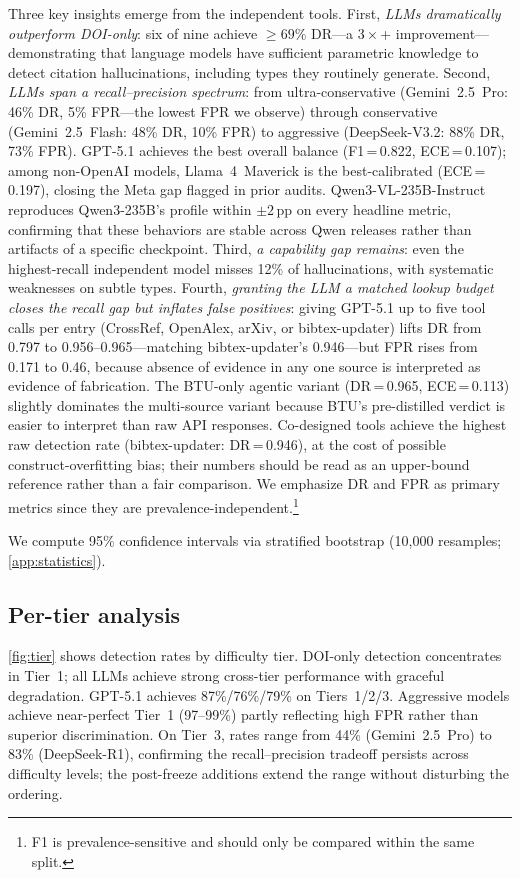 Three key insights emerge from the independent tools.
First, \emph{LLMs dramatically outperform DOI-only}: six of nine achieve ${\geq}69\%$ DR---a $3{\times}$+ improvement---demonstrating that language models have sufficient parametric knowledge to detect citation hallucinations, including types they routinely generate.
Second, \emph{LLMs span a recall--precision spectrum}: from ultra-conservative (Gemini~2.5~Pro: 46\% DR, 5\% FPR---the lowest FPR we observe) through conservative (Gemini~2.5~Flash: 48\% DR, 10\% FPR) to aggressive (DeepSeek-V3.2: 88\% DR, 73\% FPR).
GPT-5.1 achieves the best overall balance (F1\,=\,0.822, ECE\,=\,0.107); among non-OpenAI models, Llama~4~Maverick is the best-calibrated (ECE\,=\,0.197), closing the Meta gap flagged in prior audits.
Qwen3-VL-235B-Instruct reproduces Qwen3-235B's profile within ${\pm}2$\,pp on every headline metric, confirming that these behaviors are stable across Qwen releases rather than artifacts of a specific checkpoint.
Third, \emph{a capability gap remains}: even the highest-recall independent model misses 12\% of hallucinations, with systematic weaknesses on subtle types.
Fourth, \emph{granting the LLM a matched lookup budget closes the recall gap but inflates false positives}: giving GPT-5.1 up to five tool calls per entry (CrossRef, OpenAlex, arXiv, or bibtex-updater) lifts DR from 0.797 to 0.956--0.965---matching bibtex-updater's 0.946---but FPR rises from 0.171 to 0.46, because absence of evidence in any one source is interpreted as evidence of fabrication.
The BTU-only agentic variant (DR\,=\,0.965, ECE\,=\,0.113) slightly dominates the multi-source variant because BTU's pre-distilled verdict is easier to interpret than raw API responses.
Co-designed tools achieve the highest raw detection rate (bibtex-updater: DR\,=\,0.946), at the cost of possible construct-overfitting bias; their numbers should be read as an upper-bound reference rather than a fair comparison.
We emphasize DR and FPR as primary metrics since they are prevalence-independent.\footnote{F1 is prevalence-sensitive and should only be compared within the same split.}

We compute 95\% confidence intervals via stratified bootstrap (10{,}000 resamples; \cref{app:statistics}).

\subsection{Per-tier analysis}
\label{sec:per_tier}

\cref{fig:tier} shows detection rates by difficulty tier.
DOI-only detection concentrates in Tier~1; all LLMs achieve strong cross-tier performance with graceful degradation.
GPT-5.1 achieves 87\%/76\%/79\% on Tiers~1/2/3.
Aggressive models achieve near-perfect Tier~1 (97--99\%) partly reflecting high FPR rather than superior discrimination.
On Tier~3, rates range from 44\% (Gemini~2.5~Pro) to 83\% (DeepSeek-R1), confirming the recall--precision tradeoff persists across difficulty levels; the post-freeze additions extend the range without disturbing the ordering.


